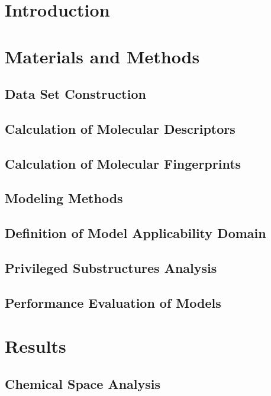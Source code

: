 \documentclass[10pt, letter]{report}
\renewcommand{\=}{\, =\, }
\newcommand{\+}{\, +\, }
\renewcommand{\-}{\, -\, }
\begin{document}
\chapter{Introduction}

\chapter{Materials and Methods}

\section{Data Set Construction}

\section{Calculation of Molecular Descriptors}

\section{Calculation of Molecular Fingerprints}

\section{Modeling Methods}

\section{Definition of Model Applicability Domain}

\section{Privileged Substructures Analysis}

\section{Performance Evaluation of Models}

\chapter{Results}

\section{Chemical Space Analysis}
\end{document}
